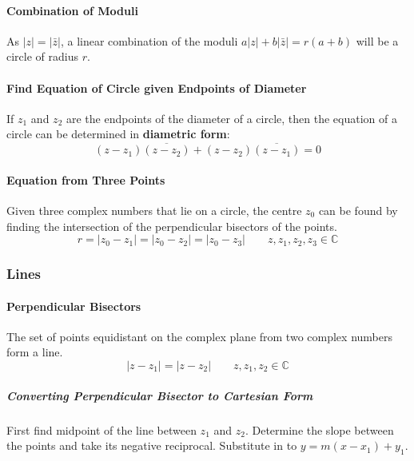 \documentclass[a4paper,twoside]{article}
\begin{document}
				\paragraph{Combination of Moduli} As $|z|=|\bar{z}|$, a linear combination of the moduli $a|z|+b|\bar{z}|=r(a+b)$ will be a circle of radius $r$.
				\paragraph{Find Equation of Circle given Endpoints of Diameter} If $z_1$ and $z_2$ are the endpoints of the diameter of a circle, then the equation of a circle can be determined in \textbf{diametric form}:
				\[
					(z-z_1)\overline{\left(z-z_2\right)}+(z-z_2)\overline{\left(z-z_1\right)}=0
				\]
				\paragraph{Equation from Three Points} Given three complex numbers that lie on a circle, the centre $z_0$ can be found by finding the intersection of the perpendicular bisectors of the points.
				\[
					r=|z_0-z_1|=|z_0-z_2|=|z_0-z_3|\qquad z,z_1,z_2,z_3\in\mathbb{C}
				\]
			\subsubsection{Lines}
				\paragraph{Perpendicular Bisectors} The set of points equidistant on the complex plane from two complex numbers form a line.
				\[
					|z-z_1|=|z-z_2|\qquad z,z_1,z_2\in\mathbb{C}
				\]
					\subparagraph{Converting Perpendicular Bisector to Cartesian Form} First find midpoint of the line between $z_1$ and $z_2$. Determine the slope between the points and take its negative reciprocal. Substitute in to $y=m(x-x_1)+y_1$.
\end{document}
